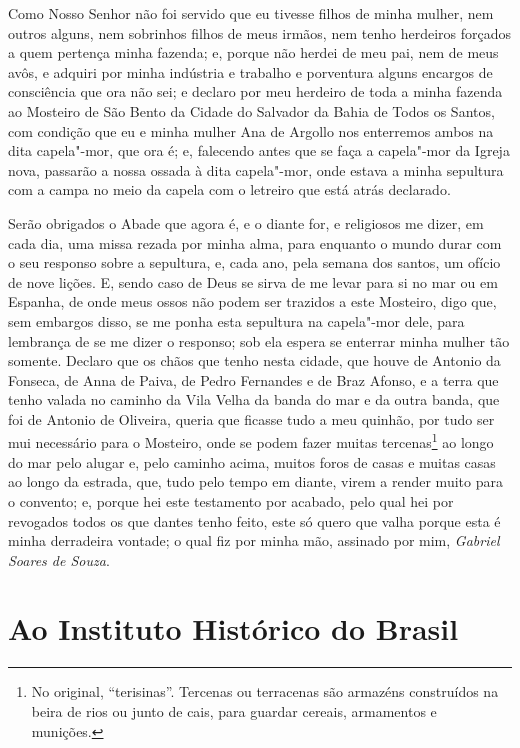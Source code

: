  Como Nosso Senhor não foi servido que eu tivesse filhos de minha
mulher, nem outros alguns, nem sobrinhos filhos de meus irmãos, nem
tenho herdeiros forçados a quem pertença minha fazenda; e, porque não
herdei de meu pai, nem de meus avôs, e adquiri por minha indústria e
trabalho e porventura alguns encargos de consciência que ora não sei; e
declaro por meu herdeiro de toda a minha fazenda ao Mosteiro de São
Bento da Cidade do Salvador da Bahia de Todos os Santos, com condição
que eu e minha mulher Ana de Argollo nos enterremos ambos na dita
capela"-mor, que ora é; e, falecendo antes que se faça a capela"-mor da
Igreja nova, passarão a nossa ossada à dita capela"-mor, onde estava a
minha sepultura com a campa no meio da capela com o letreiro que está atrás
declarado.

Serão obrigados o Abade que agora é, e o diante for, e religiosos me
dizer, em cada dia, uma missa rezada por minha alma, para enquanto o
mundo durar com o seu responso sobre a sepultura, e, cada ano, pela
semana dos santos, um ofício de nove lições. E, sendo caso de Deus se
sirva de me levar para si no mar ou em Espanha, de onde meus ossos não
podem ser trazidos a este Mosteiro, digo que, sem embargos disso, se me
ponha esta sepultura na capela"-mor dele, para lembrança de se me dizer
o responso; sob ela espera se enterrar minha mulher tão somente.
Declaro que os chãos que tenho nesta cidade, que houve de Antonio da	\EP[-1]
Fonseca, de Anna de Paiva, de Pedro Fernandes e de Braz Afonso, e a
terra que tenho valada no caminho da Vila Velha da banda do mar e da
outra banda, que foi de Antonio de Oliveira, queria que ficasse tudo a
meu quinhão, por tudo ser mui necessário para o Mosteiro, onde se podem
fazer muitas tercenas\footnote{ No original, “terisinas”. Tercenas ou
terracenas são armazéns construídos na beira de rios ou junto de cais,
para guardar cereais, armamentos e munições.} ao longo do mar pelo
alugar e, pelo caminho acima, muitos foros de casas e muitas casas ao
longo da estrada, que, tudo pelo tempo em diante, virem a render muito
para o convento; e, porque hei este testamento por acabado, pelo qual
hei por revogados todos os que dantes tenho feito, este só quero que
valha porque esta é minha derradeira vontade; o qual fiz por minha mão,
assinado por mim, \textit{Gabriel Soares de Souza}. 


\chapter[Ao Instituto Histórico do Brasil]{Ao Instituto Histórico do Brasil}

